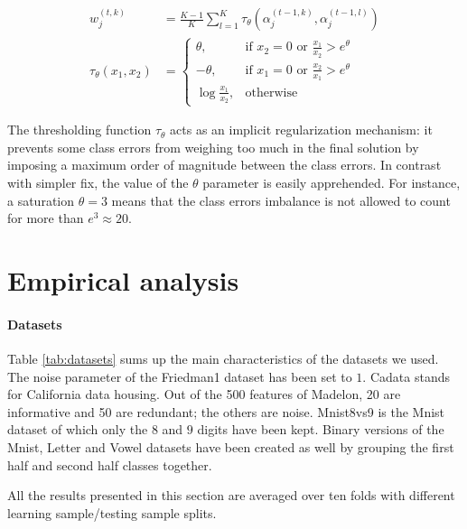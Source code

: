 \documentclass{article}
\begin{document}
\vspace*{-\baselineskip}
\begin{align}\label{eq:METrimmed}
w_j^{(t,k)} &= \frac{K-1}{K} \sum_{l=1}^{K} \tau_{\theta} \left(\alpha_j^{(t-1, 
k)},  \alpha_j^{(t-1, l)}\right)\\
\tau_{\theta}(x_1, x_2) &=\begin{cases}
    \theta, & \text{if $x_2 = 0$ or $\frac{x_1}{x_2} > e^{\theta}$}\\
    -\theta,& \text{if $x_1 = 0$ or $\frac{x_2}{x_1} > e^{\theta}$}\\
    \log \frac{x_1}{x_2}, & \text{otherwise}
  \end{cases}
\end{align}
\vspace*{-\baselineskip}

The thresholding function $\tau_{\theta}$ acts as an implicit regularization 
mechanism: it prevents some class errors from weighing too much in the final 
solution by imposing a maximum order of magnitude between the class errors. In 
contrast with simpler fix, the value of the  $\theta$ parameter is easily 
apprehended.%
For instance, a saturation $\theta=3$ means that the class errors imbalance is 
not allowed to count for more than $e^3 \approx 20$. 




\section{Empirical analysis}
\label{sec:analysis}

\paragraph{Datasets}
Table \ref{tab:datasets} sums up the main characteristics of the datasets we 
used. The noise parameter of the Friedman1 dataset has been set to $1$. Cadata 
stands for California data housing. Out of the 500 features of Madelon, 20 are 
informative and 50 are redundant; the others are noise. Mnist8vs9 is the Mnist 
dataset of which only the $8$ and $9$ digits have been kept. Binary versions 
of the Mnist, Letter and Vowel datasets have been created as well by grouping 
the first half and second half classes together.

All the results presented in this section are averaged over ten folds with 
different learning sample/testing sample splits.
\end{document}
